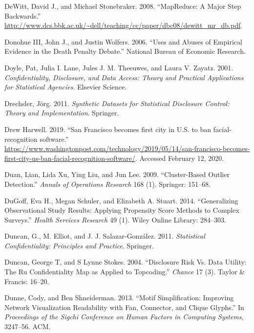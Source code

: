 \documentclass[]{krantz}
\begin{document}
\hypertarget{ref-MapReduceBad}{}
DeWitt, David J., and Michael Stonebraker. 2008. ``MapReduce: A Major
Step Backwards.''
\url{http://www.dcs.bbk.ac.uk/~dell/teaching/cc/paper/dbc08/dewitt_mr_db.pdf}.

\hypertarget{ref-donohue2006uses}{}
Donohue III, John J., and Justin Wolfers. 2006. ``Uses and Abuses of
Empirical Evidence in the Death Penalty Debate.'' National Bureau of
Economic Research.

\hypertarget{ref-doyle2001confidentiality}{}
Doyle, Pat, Julia I. Lane, Jules J. M. Theeuwes, and Laura V. Zayatz.
2001. \emph{Confidentiality, Disclosure, and Data Access: Theory and
Practical Applications for Statistical Agencies}. Elsevier Science.

\hypertarget{ref-drechsler2011synthetic}{}
Drechsler, Jörg. 2011. \emph{Synthetic Datasets for Statistical
Disclosure Control: Theory and Implementation}. Springer.

\hypertarget{ref-harwell2019}{}
Drew Harwell. 2019. ``San Francisco becomes first city in U.S. to ban
facial-recognition software.''
\url{https://www.washingtonpost.com/technology/2019/05/14/san-francisco-becomes-first-city-us-ban-facial-recognition-software/}.
Accessed February 12, 2020.

\hypertarget{ref-duan2009cluster}{}
Duan, Lian, Lida Xu, Ying Liu, and Jun Lee. 2009. ``Cluster-Based
Outlier Detection.'' \emph{Annals of Operations Research} 168 (1).
Springer: 151--68.

\hypertarget{ref-dugoff2014generalizing}{}
DuGoff, Eva H., Megan Schuler, and Elizabeth A. Stuart. 2014.
``Generalizing Observational Study Results: Applying Propensity Score
Methods to Complex Surveys.'' \emph{Health Services Research} 49 (1).
Wiley Online Library: 284--303.

\hypertarget{ref-duncanstatistical}{}
Duncan, G., M. Elliot, and J. J. Salazar-González. 2011.
\emph{Statistical Confidentiality: Principles and Practice}. Springer.

\hypertarget{ref-duncan2004disclosure}{}
Duncan, George T, and S Lynne Stokes. 2004. ``Disclosure Risk Vs. Data
Utility: The Ru Confidentiality Map as Applied to Topcoding.''
\emph{Chance} 17 (3). Taylor \& Francis: 16--20.

\hypertarget{ref-dunne2013motif}{}
Dunne, Cody, and Ben Shneiderman. 2013. ``Motif Simplification:
Improving Network Visualization Readability with Fan, Connector, and
Clique Glyphs.'' In \emph{Proceedings of the Sigchi Conference on Human
Factors in Computing Systems}, 3247--56. ACM.
\end{document}
